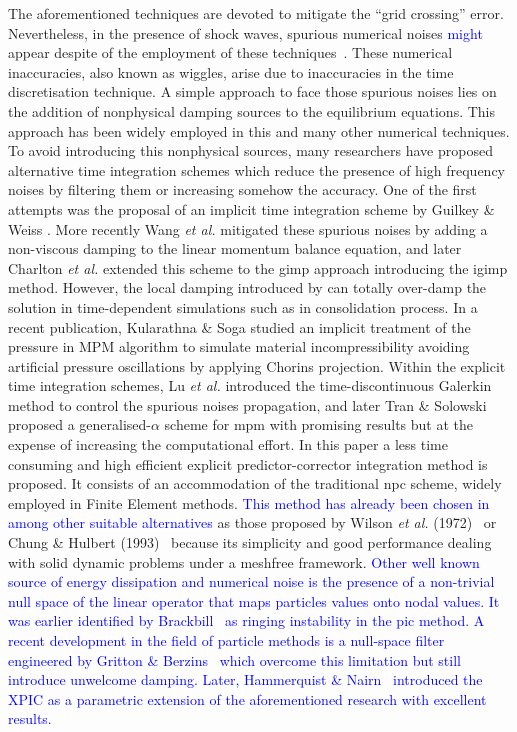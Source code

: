 \documentclass[preprint,12pt,a4paper]{elsarticle}
\begin{document}
The aforementioned techniques are devoted to mitigate the
``grid crossing'' error. Nevertheless, in the presence of shock waves, spurious
numerical noises \textcolor{blue}{might} appear despite of the employment of these techniques~\cite{Tran2019e}. These numerical inaccuracies, also known
as wiggles, arise due to inaccuracies in the time discretisation technique.
A simple approach to face those spurious noises lies on the addition of nonphysical damping sources to the equilibrium equations. This
approach has been widely employed in this and many other numerical
techniques. To avoid introducing this nonphysical sources, many
researchers have proposed alternative time integration
schemes which reduce the presence of high frequency noises by
filtering them or increasing somehow the accuracy. One of the first attempts was the proposal of an implicit time integration scheme by Guilkey \& Weiss \cite{Guilkey_2003}. More recently Wang {\it et al.}
\cite{Wang_2016} mitigated these spurious noises by adding a non-viscous
damping to the linear momentum balance equation, and later Charlton
{\it et al.} \cite{Charlton_2017} extended this scheme to the
\acrshort{gimp} approach introducing the \acrfull{igimp}
method. However, the local damping introduced by 
\cite{Wang_2016} can totally over-damp the solution in time-dependent
simulations such as in consolidation process. In a recent publication,
Kularathna \& Soga \cite{Soga_2017} studied an implicit treatment of the pressure in MPM algorithm to simulate material incompressibility
avoiding artificial pressure oscillations by applying
Chorin\textquotesingle s
projection. Within the explicit time integration schemes, Lu {\it et al.}\cite{LU_2018} introduced the time-discontinuous Galerkin method to control the spurious noises
propagation, and later Tran \& Solowski~\cite{Tran2019e}
proposed a generalised-$\alpha$ scheme for \acrshort{mpm} with
promising results but at the expense of increasing the computational
effort. In this paper a less time consuming and high efficient explicit predictor-corrector integration method is
proposed. It consists of an accommodation of the traditional \acrfull{npc} scheme, widely employed in Finite Element methods. \textcolor{blue}{This method
has already been chosen in ~\cite{Navas2018a} among other suitable alternatives} as those proposed
by Wilson {\it et al.} (1972)~\cite{Wilson1972} or Chung \& Hulbert
(1993)~\cite{Geranlized_alpha_1993} because its simplicity and good
performance dealing with solid dynamic problems under a meshfree
framework.  
\textcolor{blue}{Other well known source of energy dissipation and numerical noise is the presence of a non-trivial null space of the linear operator that maps particles values onto nodal values. It was earlier identified by Brackbill~\cite{BRACKBILL1988469} as ringing instability in the \acrfull{pic} method. A recent development in the field of particle methods is a null-space filter engineered by Gritton \&
Berzins~\cite{Gritton2017} which overcome this limitation but still introduce unwelcome damping.  Later, Hammerquist \& Nairn~\cite{HAMMERQUIST2017724} introduced the XPIC as a parametric extension of the aforementioned research with excellent results.}
\end{document}
